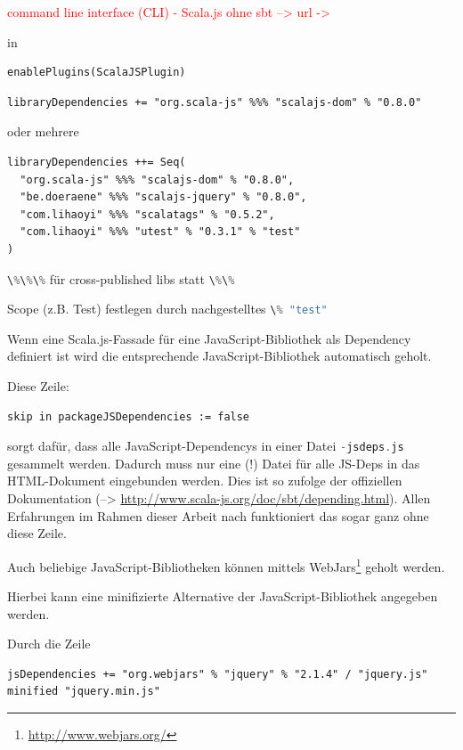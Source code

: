 \documentclass[a4paper, 12pt, hidelinks, listof=totoc, listoftables=totoc, bibliography=totoc]{scrreprt}
\newcommand{\code}[1]{\lstinline[language=Scala, style=inline]|#1|}
\newcommand{\TODO}[1]{\textcolor{red}{#1}\newline}
\begin{document}
\TODO{command line interface (CLI)}
\TODO{  - Scala.js ohne sbt  -->  url -> %
}



in
\begin{lstlisting}[style=snippet]
enablePlugins(ScalaJSPlugin)
\end{lstlisting}

\begin{lstlisting}[style=snippet]
libraryDependencies += "org.scala-js" %%% "scalajs-dom" % "0.8.0"
\end{lstlisting}

oder mehrere

\begin{lstlisting}[style=snippet]
libraryDependencies ++= Seq(
  "org.scala-js" %%% "scalajs-dom" % "0.8.0",
  "be.doeraene" %%% "scalajs-jquery" % "0.8.0",
  "com.lihaoyi" %%% "scalatags" % "0.5.2",
  "com.lihaoyi" %%% "utest" % "0.3.1" % "test"
)
\end{lstlisting}

\code{\%\%\%} für cross-published libs statt \code{\%\%}

Scope (z.B. Test) festlegen durch nachgestelltes \code{\% "test"}

Wenn eine Scala.js-Fassade für eine JavaScript-Bibliothek als Dependency definiert ist wird die entsprechende JavaScript-Bibliothek automatisch geholt.


Diese Zeile:

\begin{lstlisting}[style=snippet]
skip in packageJSDependencies := false
\end{lstlisting}

sorgt dafür, dass alle JavaScript-Dependencys in einer Datei \code{-jsdeps.js} gesammelt werden. Dadurch muss nur eine (!) Datei für alle JS-Deps in das HTML-Dokument eingebunden werden. Dies ist so zufolge der offiziellen Dokumentation (-->  \url{http://www.scala-js.org/doc/sbt/depending.html}). Allen Erfahrungen im Rahmen dieser Arbeit nach funktioniert das sogar ganz ohne diese Zeile.

Auch beliebige JavaScript-Bibliotheken können mittels WebJars\footnote{\url{http://www.webjars.org/}} geholt werden.

Hierbei kann eine minifizierte Alternative der JavaScript-Bibliothek angegeben werden. 

Durch die Zeile

\begin{lstlisting}[style=snippet]
jsDependencies += "org.webjars" % "jquery" % "2.1.4" / "jquery.js" minified "jquery.min.js"
\end{lstlisting}
\end{document}
